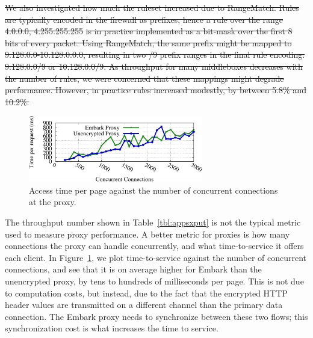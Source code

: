 \documentclass[letterpaper,twocolumn,10pt]{article}
\newcommand{\sys}{Embark\xspace} %
\providecommand{\DIFdeltex}[1]{{\protect\color{red}\sout{#1}}}                      %
\providecommand{\DIFdelbegin}{} %
\providecommand{\DIFdelend}{} %
\providecommand{\DIFdelbeginFL}{} %
\providecommand{\DIFdelendFL}{} %
\providecommand{\DIFdel}[1]{\texorpdfstring{\DIFdeltex{#1}}{}} %
\begin{document}
\DIFdelbegin \DIFdel{We also investigated how much the ruleset increased due to RangeMatch. Rules are typically encoded in the firewall as prefixes, hence a rule over the range }%
\DIFdel{4.0.0.0, 4.255.255.255}%
\DIFdel{is in practice implemented as a bit-mask over the first 8 bits of every packet.
Using RangeMatch, the same prefix might be mapped to 9.128.0.0-10.128.0.0.0, resulting in two /9 prefix ranges in the final rule encoding: 9.128.0.0/9 or 10.128.0.0/9.
As throughput for many middleboxes decreases with the number of rules, we were concerned that these mappings might degrade performance.
However, in practice rules increased modestly, by between 5.8\% and 10.2\%.
}\DIFdelend %

\begin{figure}[t]
\centering
\DIFdelbeginFL %
\DIFdelendFL \includegraphics[width=3in]{fig/proxytime}
\caption{\label{fig:proxygraph} Access time per page against the number of concurrent connections at the proxy.}
\end{figure}

 The throughput number shown in Table~\ref{tbl:appsxput} is not the typical metric used to measure proxy performance. A better metric for proxies is how many connections the proxy can handle concurrently, and what time-to-service it offers each client. In Figure~\ref{fig:proxygraph}, we plot time-to-service against the number of concurrent connections, and see that it is on average higher for \sys than the unencrypted proxy, by tens to hundreds of milliseconds per page.
This is not due to computation costs, but instead, due to the fact that the encrypted HTTP header values are transmitted on a different channel than the primary data connection.
The \sys proxy needs to synchronize between these two flows; this synchronization cost is what increases the time to service. 
\end{document}
